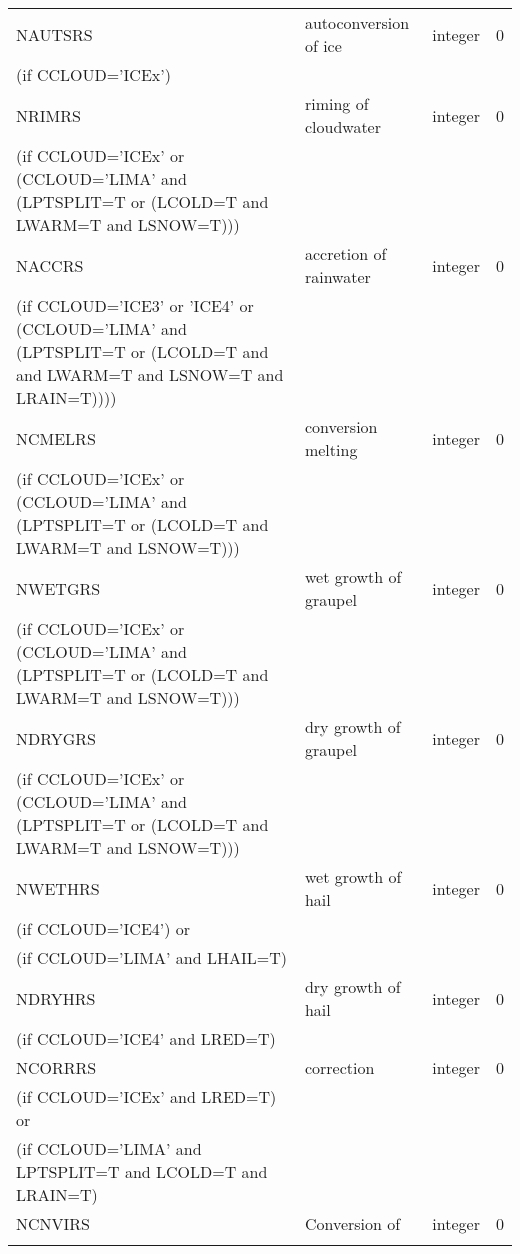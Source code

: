 \begin{longtable} {|p{}|p{}|>{\centering}p{}|p{}<{\centering}|}
NAUTSRS  & autoconversion of ice   & integer  &  0 \index{NAUTSRS!\innam{NAM\_BU\_RRS}}\\ \nopagebreak
(if CCLOUD='ICEx') & &   &  \\\hline
NRIMRS   & riming of cloudwater    & integer  &  0 \index{NRIMRS!\innam{NAM\_BU\_RRS}}\\ \nopagebreak
(if CCLOUD='ICEx' or (CCLOUD='LIMA' and (LPTSPLIT=T or (LCOLD=T and LWARM=T and LSNOW=T))) & & & \\\hline
NACCRS   & accretion of rainwater  & integer  &  0 \index{NACCRS!\innam{NAM\_BU\_RRS}}\\ \nopagebreak
(if CCLOUD='ICE3' or 'ICE4' or (CCLOUD='LIMA' and (LPTSPLIT=T or (LCOLD=T and and LWARM=T and LSNOW=T and LRAIN=T)))) & &   &  \\\hline
NCMELRS  & conversion melting     & integer  &  0 \index{NCMELRS!\innam{NAM\_BU\_RRS}}\\ \nopagebreak
(if CCLOUD='ICEx' or (CCLOUD='LIMA' and (LPTSPLIT=T or (LCOLD=T and LWARM=T and LSNOW=T))) & & & \\\hline
NWETGRS  & wet growth of graupel   & integer  &  0 \index{NWETGRS!\innam{NAM\_BU\_RRS}}\\ \nopagebreak
(if CCLOUD='ICEx' or (CCLOUD='LIMA' and (LPTSPLIT=T or (LCOLD=T and LWARM=T and LSNOW=T))) & & & \\\hline
NDRYGRS  & dry growth of graupel   & integer  &  0 \index{NDRYGRS!\innam{NAM\_BU\_RRS}}\\ \nopagebreak
(if CCLOUD='ICEx' or (CCLOUD='LIMA' and (LPTSPLIT=T or (LCOLD=T and LWARM=T and LSNOW=T))) & & & \\\hline
NWETHRS  & wet growth of hail  & integer  &  0 \index{NWETHRS!\innam{NAM\_BU\_RRS}}\\ \nopagebreak
(if CCLOUD='ICE4') or & &   &  \\  \nopagebreak
(if CCLOUD='LIMA' and LHAIL=T) & &   &  \\\hline
NDRYHRS&    dry growth of hail& integer  &  0 \index{NDRYHRS!\innam{NAM\_BU\_RRS}}\\ \nopagebreak
(if CCLOUD='ICE4' and LRED=T) & &   &  \\\hline
NCORRRS&   correction & integer  &  0 \index{NCORRRS!\innam{NAM\_BU\_RRS}}\\ \nopagebreak
(if CCLOUD='ICEx' and LRED=T) or & &   &  \\ \nopagebreak
(if CCLOUD='LIMA' and LPTSPLIT=T and LCOLD=T and LRAIN=T) & &   &  \\\hline
NCNVIRS  &Conversion of    & integer  &  0 \index{NCNVIRS!\innam{NAM\_BU\_RRS}}\\ \nopagebreak

\end{longtable}
